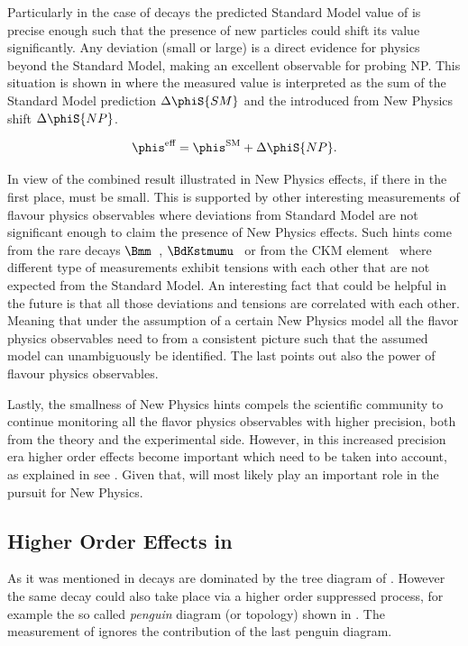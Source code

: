 Particularly in the case of \BsJpsiPhi decays the predicted Standard Model value of  is precise enough
such that the presence of new particles could shift its value ~\cite{Buras:2009if,Chiang:2009ev,Datta:2009fk} significantly.
Any deviation (small or large) is a direct evidence for physics beyond the Standard Model, making \phis an excellent observable for probing NP.
This situation is shown in  where the measured value  is interpreted
as the sum of the Standard Model prediction $\Delta\phiS{SM}$ and the introduced from New Physics shift $\Delta\phiS{NP}$.

\begin{equation}
 \phis^{\text {eff}} = \phis^{\tiny \text{SM}} + \Delta\phiS{NP}.
 \label{phis_meas}
\end{equation}

In view of the combined \phis result illustrated in  New Physics effects, if there in the first place, must be small.
This is supported by other interesting measurements of flavour physics observables where deviations from Standard Model are not significant enough
to claim the presence of New Physics effects. Such hints come from the rare decays $\Bmm$~\cite{CMS:2014xfa}, $\BdKstmumu$~\cite{Aaij:2015oid}
or from the \Vub CKM element~\cite{Aaij:2015bfa} where different type of measurements exhibit tensions with each other that are not expected from the Standard Model.
An interesting fact that could be helpful in the future is that all those deviations and tensions are
correlated with each other. Meaning that under the assumption of a certain New Physics model all the flavor physics
observables need to from a consistent picture such that the assumed model can unambiguously be identified.
The last points out also the power of flavour physics observables.

Lastly, the smallness of New Physics hints compels the scientific community to continue monitoring all the
flavor physics observables with higher precision, both from the theory and the experimental side.
However, in this increased precision era higher order effects become important which need to be taken into account,
as explained in see . Given that, \phis will most likely play an important role in the
pursuit for New Physics.

\subsection{Higher Order Effects in \phis}
\label{TheBsJpsiKstDecay}
As it was mentioned in  \BsJpsiPhi decays are dominated by the tree diagram of .
However the same decay could also take place via a higher order suppressed process, for example the so called {\it penguin} diagram (or topology)
shown in . The \phis measurement of  ignores the contribution of the last penguin diagram.

